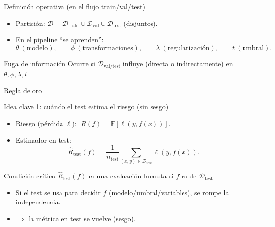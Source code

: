 \begin{frame}{Definición operativa (en el flujo train/val/test)}

\small
\begin{itemize}\setlength{\itemsep}{0.4em}
  \item Partición: \(\mathcal{D}=\mathcal{D}_{\text{train}}\cup\mathcal{D}_{\text{val}}\cup\mathcal{D}_{\text{test}}\) (disjuntos).
  \item En el pipeline “se aprenden”:
  \[
  \theta\ (\text{modelo}),\qquad \phi\ (\text{transformaciones}),\qquad \lambda\ (\text{regularización}),\qquad t\ (\text{umbral}).
  \]
\end{itemize}

\begin{block}{Fuga de información}
Ocurre si \(\mathcal{D}_{\text{val/test}}\) influye (directa o indirectamente) en \(\theta,\phi,\lambda,t\).
\end{block}

\begin{block}{Regla de oro}
\end{block}
\end{frame}

\begin{frame}{Idea clave 1: cuándo el test estima el riesgo (sin sesgo)}

\small
\begin{itemize}\setlength{\itemsep}{0.35em}
  \item Riesgo (pérdida \(\ell\)): \(\;R(f)=\mathbb{E}[\ell(y,f(x))]\).
  \item Estimador en test:
  \[
  \widehat{R}_{\text{test}}(f)=\frac{1}{n_{\text{test}}}\sum_{(x,y)\in\mathcal{D}_{\text{test}}}\ell\!\left(y,f(x)\right).
  \]
\end{itemize}

\begin{block}{Condición crítica}
\(\widehat{R}_{\text{test}}(f)\) es una evaluación honesta si \(f\) es  de \(\mathcal{D}_{\text{test}}\).
\end{block}

\begin{itemize}\setlength{\itemsep}{0.25em}
  \item Si el test se usa para decidir \(f\) (modelo/umbral/variables), se rompe la independencia.
  \item \(\Rightarrow\) la métrica en test se vuelve  (sesgo).
\end{itemize}
\end{frame}

